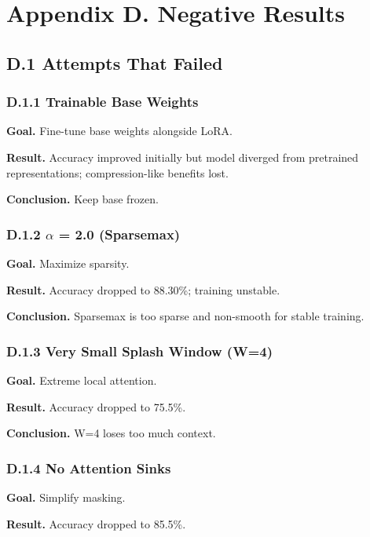 
\section{Appendix D. Negative Results}

\subsection{D.1 Attempts That Failed}

\subsubsection{D.1.1 Trainable Base Weights}

\textbf{Goal.} Fine-tune base weights alongside LoRA.

\textbf{Result.} Accuracy improved initially but model diverged from pretrained 
representations; compression-like benefits lost.

\textbf{Conclusion.} Keep base frozen.

\subsubsection{D.1.2 $\alpha$ = 2.0 (Sparsemax)}

\textbf{Goal.} Maximize sparsity.

\textbf{Result.} Accuracy dropped to 88.30\%; training unstable.

\textbf{Conclusion.} Sparsemax is too sparse and non-smooth for stable training.

\subsubsection{D.1.3 Very Small Splash Window (W=4)}

\textbf{Goal.} Extreme local attention.

\textbf{Result.} Accuracy dropped to 75.5\%.

\textbf{Conclusion.} W=4 loses too much context.

\subsubsection{D.1.4 No Attention Sinks}

\textbf{Goal.} Simplify masking.

\textbf{Result.} Accuracy dropped to 85.5\%.

